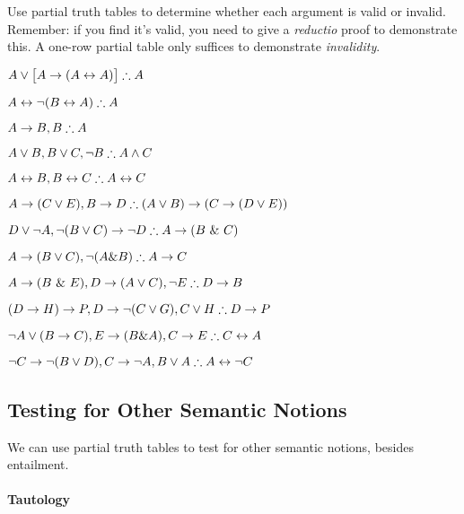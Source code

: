 \practiceproblems
\problempart
Use partial truth tables to determine whether each argument is valid or invalid.  Remember: if you find it's valid, you need to give a \emph{reductio} proof to demonstrate this.  A one-row partial table only suffices to demonstrate \emph{invalidity}.
\begin{earg}
\item $A\vee\bigl[A\rightarrow(A\leftrightarrow A)\bigr] \therefore A$ %
\item $A\leftrightarrow\neg(B\leftrightarrow A) \therefore A$ %
\item $A\rightarrow B, B \therefore A$ %
\item $A\vee B, B\vee C, \neg B \therefore A \wedge C$ %
\item $A\leftrightarrow B, B\leftrightarrow C \therefore A\leftrightarrow C$ %

\item $A \rightarrow (C \vee E), B \rightarrow D  \therefore   (A \vee B) \rightarrow (C \rightarrow  (D \vee E))$ %

\item $ D \vee \neg A, \neg (B \vee C) \rightarrow \neg D \therefore A \rightarrow (B \ \& \ C)$ %


\item $A \rightarrow (B \vee C), \neg(A \& B) \therefore A \rightarrow C$ %

\item $A \rightarrow (B \ \& \ E), D \rightarrow (A \vee C), \neg E \therefore D \rightarrow B$ %

\item $(D \rightarrow H) \rightarrow P, D \rightarrow \neg (C \vee G), C \vee H \therefore D \rightarrow P$ %

\item $\neg A \vee (B\rightarrow C), E \rightarrow (B \& A), C\rightarrow E \therefore C \leftrightarrow A$ %

\item $\neg C \rightarrow \neg(B \vee D), C \rightarrow \neg A, B \vee A \therefore A \leftrightarrow \neg C$
\end{earg}

\subsection{Testing for Other Semantic Notions}




We can use partial truth tables to test for other semantic notions, besides entailment.

\paragraph{Tautology}

